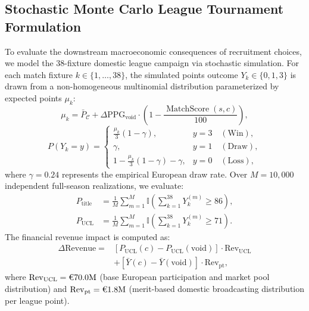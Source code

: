 \documentclass[10pt,journal,compsoc]{IEEEtran}
\begin{document}
\subsection{Stochastic Monte Carlo League Tournament Formulation}
To evaluate the downstream macroeconomic consequences of recruitment choices, we model the 38-fixture domestic league campaign via stochastic simulation. For each match fixture $k \in \{1, \dots, 38\}$, the simulated points outcome $Y_k \in \{0, 1, 3\}$ is drawn from a non-homogeneous multinomial distribution parameterized by expected points $\mu_k$:
\begin{equation}
\mu_k = \bar{P}_{\mathcal{C}} + \Delta\mathrm{PPG}_{\mathrm{void}} \cdot \left(1 - \frac{\operatorname{MatchScore}(s, c)}{100}\right),
\end{equation}
\begin{equation}
P(Y_k = y) = \begin{cases}
\frac{\mu_k}{3}(1 - \gamma), & y = 3 \quad (\text{Win}), \\
\gamma, & y = 1 \quad (\text{Draw}), \\
1 - \frac{\mu_k}{3}(1 - \gamma) - \gamma, & y = 0 \quad (\text{Loss}),
\end{cases}
\end{equation}
where $\gamma = 0.24$ represents the empirical European draw rate. Over $M = 10,000$ independent full-season realizations, we evaluate:
\begin{align}
P_{\mathrm{title}} &= \frac{1}{M}\sum_{m=1}^M \mathbb{I}\left(\sum_{k=1}^{38} Y_{k}^{(m)} \ge 86\right), \\
P_{\mathrm{UCL}} &= \frac{1}{M}\sum_{m=1}^M \mathbb{I}\left(\sum_{k=1}^{38} Y_{k}^{(m)} \ge 71\right).
\end{align}
The financial revenue impact is computed as:
\begin{equation}
\begin{aligned}
\Delta\mathrm{Revenue} = & \left[ P_{\mathrm{UCL}}(c) - P_{\mathrm{UCL}}(\mathrm{void}) \right] \cdot \mathrm{Rev}_{\mathrm{UCL}} \\
& + \left[ \bar{Y}(c) - \bar{Y}(\mathrm{void}) \right] \cdot \mathrm{Rev}_{\mathrm{pt}},
\end{aligned}
\end{equation}
where $\mathrm{Rev}_{\mathrm{UCL}} = \text{\texteuro70.0M}$ (base European participation and market pool distribution) and $\mathrm{Rev}_{\mathrm{pt}} = \text{\texteuro1.8M}$ (merit-based domestic broadcasting distribution per league point).
\end{document}
